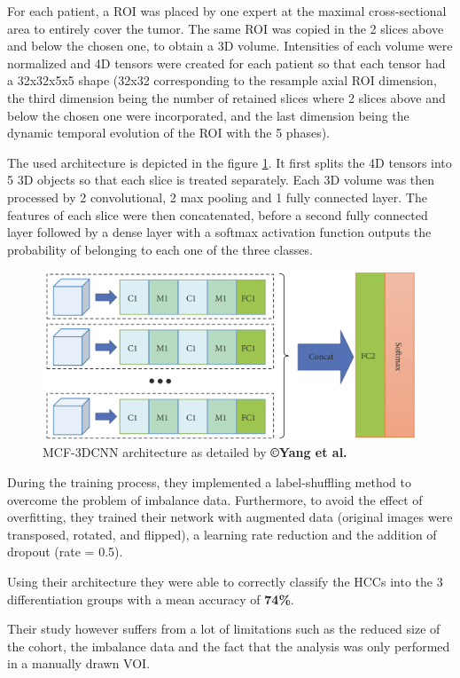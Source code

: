 \documentclass[]{article}
\begin{document}
For each patient, a ROI was placed by one expert at the maximal
cross-sectional area to entirely cover the tumor. The same ROI was
copied in the 2 slices above and below the chosen one, to obtain a 3D
volume. Intensities of each volume were normalized and 4D tensors were
created for each patient so that each tensor had a 32x32x5x5 shape
(32x32 corresponding to the resample axial ROI dimension, the third
dimension being the number of retained slices where 2 slices above and
below the chosen one were incorporated, and the last dimension being the
dynamic temporal evolution of the ROI with the 5 phases).

The used architecture is depicted in the figure \ref{fig:Yang2019_Figure2_MCF-3DCNN}. It first splits the 4D
tensors into 5 3D objects so that each slice is treated separately. Each
3D volume was then processed by 2 convolutional, 2 max pooling and 1
fully connected layer. The features of each slice were then
concatenated, before a second fully connected layer followed by a dense
layer with a softmax activation function outputs the probability of
belonging to each one of the three classes.

\begin{figure}[th!]
\centering
\includegraphics[width=0.7\linewidth]{images/Yang2019_Fig2}
\caption{MCF-3DCNN architecture as detailed by \textbf{©Yang et al. \cite{Yang2019}}}
\label{fig:Yang2019_Figure2_MCF-3DCNN}
\end{figure}


During the training process, they implemented a label-shuffling method
to overcome the problem of imbalance data. Furthermore, to avoid the
effect of overfitting, they trained their network with augmented data
(original images were transposed, rotated, and flipped), a learning rate
reduction and the addition of dropout (rate = 0.5).

Using their architecture they were able to correctly classify the HCCs
into the 3 differentiation groups with a mean accuracy of \textbf{74\%}.


Their study however suffers from a lot of limitations such as the
reduced size of the cohort, the imbalance data and the fact that the
analysis was only performed in a manually drawn VOI.
\end{document}
